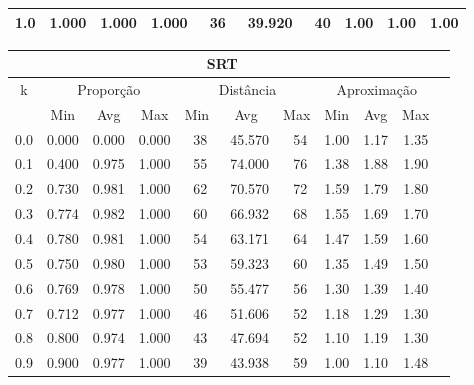 \begin{table}[!p]
\begin{center}
{\begin{tabular}{|c|c|c|c|c|c|c|c|c|c|}
1.0                & 1.000     & 1.000    & 1.000    & ~36      & ~39.920  & ~40     & 1.00    & 1.00   & 1.00            \\ \hline
\end{tabular}%
\vspace{5pt}
\begin{tabular}{|c|c|c|c|c|c|c|c|c|c|c|}
\hline
\multicolumn{10}{|c|}{\bf SRT}                                                                                            \\ \hline
\multirow{2}{*}{k} & \multicolumn{3}{c|}{Proporção}  & \multicolumn{3}{c|}{Distância} & \multicolumn{3}{c|}{Aproximação}  \\ \cline{2-10}
                   & Min       & Avg      & Max      & Min      & Avg      & Max     & Min     & Avg    & Max             \\ \hline
0.0                & 0.000     & 0.000    & 0.000    & ~38      & ~45.570  & ~54     & 1.00    & 1.17   & 1.35            \\ \hline
0.1                & 0.400     & 0.975    & 1.000    & ~55      & ~74.000  & ~76     & 1.38    & 1.88   & 1.90            \\ \hline
0.2                & 0.730     & 0.981    & 1.000    & ~62      & ~70.570  & ~72     & 1.59    & 1.79   & 1.80            \\ \hline
0.3                & 0.774     & 0.982    & 1.000    & ~60      & ~66.932  & ~68     & 1.55    & 1.69   & 1.70            \\ \hline
0.4                & 0.780     & 0.981    & 1.000    & ~54      & ~63.171  & ~64     & 1.47    & 1.59   & 1.60            \\ \hline
0.5                & 0.750     & 0.980    & 1.000    & ~53      & ~59.323  & ~60     & 1.35    & 1.49   & 1.50            \\ \hline
0.6                & 0.769     & 0.978    & 1.000    & ~50      & ~55.477  & ~56     & 1.30    & 1.39   & 1.40            \\ \hline
0.7                & 0.712     & 0.977    & 1.000    & ~46      & ~51.606  & ~52     & 1.18    & 1.29   & 1.30            \\ \hline
0.8                & 0.800     & 0.974    & 1.000    & ~43      & ~47.694  & ~52     & 1.10    & 1.19   & 1.30            \\ \hline
0.9                & 0.900     & 0.977    & 1.000    & ~39      & ~43.938  & ~59     & 1.00    & 1.10   & 1.48            \\ \hline

\end{tabular}}
\end{center}
\end{table}
